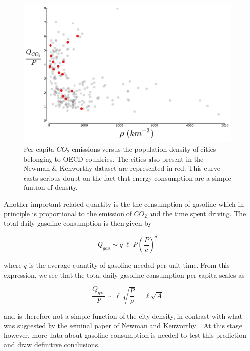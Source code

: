 \begin{figure}
    \centering
    \includegraphics[width=\textwidth]{gfx/chapter-scaling/newman_kenworthy.pdf}
    \caption{Per capita $CO_2$ emissions versus the population density of cities
    belonging to OECD countries. The cities also present in the Newman \&
    Kenworthy dataset are represented in red. This curve casts serious doubt on
the fact that energy consumption are a simple funtion of
density.\label{fig:newman_kenworthy}}
\end{figure}

Another important related quantity is the the consumption of gasoline which in
principle is proportional to the emission of $CO_2$ and the time spent driving.
The total daily gasoline consumption is then given by

\begin{equation} 
    Q_{gas} \sim q\; \ell\; P \left(\frac{P}{c}\right)^{\delta}
\end{equation}

where $q$ is the average quantity of gasoline needed per unit time. From this
expression, we see that the total daily gasoline consumption per capita scales
as

\begin{equation} 
    \frac{Q_{gas}}{P}\sim \ell\, \sqrt{\frac{P}{\rho}} = \ell
\sqrt{A} 
    \label{eq:nk_area}
\end{equation}

and is therefore not a simple function of the city density, in contrast with
what was suggested by the seminal paper of Newman and
Kenworthy~\cite{Newman:1989}. At this stage however, more data about gasoline
consumption is needed to test this prediction and draw definitive conclusions.

